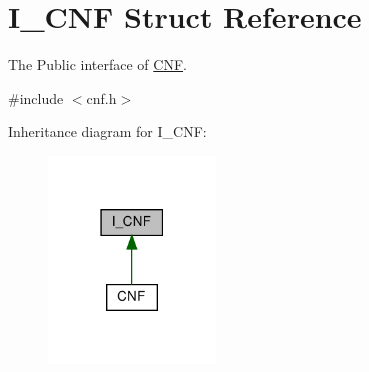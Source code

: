 \hypertarget{struct_i___c_n_f}{}\section{I\+\_\+\+C\+NF Struct Reference}
\label{struct_i___c_n_f}


The Public interface of \hyperlink{class_c_n_f}{C\+NF}.  




{\ttfamily \#include $<$cnf.\+h$>$}



Inheritance diagram for I\+\_\+\+C\+NF\+:\nopagebreak
\begin{figure}[H]
\begin{center}
\leavevmode
\includegraphics[width=126pt]{da/dda/struct_i___c_n_f__inherit__graph}
\end{center}
\end{figure}
